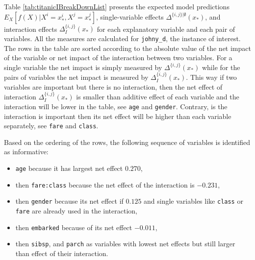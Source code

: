 \documentclass[12pt,]{krantz}
\providecommand{\tightlist}{%
  \setlength{\itemsep}{0pt}\setlength{\parskip}{0pt}}
\begin{document}
Table \ref{tab:titanicIBreakDownList} presents the expected model predictions \(E_X[f(X)|X^i = x_*^i, X^j = x_*^j]\), single-variable effects \(\Delta^{\{i,j\}|\emptyset}(x_*)\), and interaction effects \(\Delta_{I}^{\{i,j\}}(x_*)\) for each explanatory variable and each pair of variables. All the measures are calculated for \texttt{johny\_d}, the instance of interest.
The rows in the table are sorted according to the absolute value of the net impact of the variable or net impact of the interaction between two variables. For a single variable the net impact is simply measured by \(\Delta^{\{i,j\}}(x_*)\) while for the pairs of variables the net impact is measured by \(\Delta_{I}^{\{i,j\}}(x_*)\). This way if two variables are important but there is no interaction, then the net effect of interaction \(\Delta_{I}^{\{i,j\}}(x_*)\) is smaller than additive effect of each variable and the interaction will be lower in the table, see \texttt{age} and \texttt{gender}. Contrary, is the interaction is important then its net effect will be higher than each variable separately, see \texttt{fare} and \texttt{class}.

Based on the ordering of the rows, the following sequence of variables is identified as informative:

\begin{itemize}
\tightlist
\item
  \texttt{age} because it has largest net effect \(0.270\),
\item
  then \texttt{fare:class} because the net effect of the interaction is \(-0.231\),
\item
  then \texttt{gender} because its net effect if \(0.125\) and single variables like \texttt{class} or \texttt{fare} are already used in the interaction,
\item
  then \texttt{embarked} because of its net effect \(-0.011\),
\item
  then \texttt{sibsp}, and \texttt{parch} as variables with lowest net effects but still larger than effect of their interaction.
\end{itemize}
\end{document}
